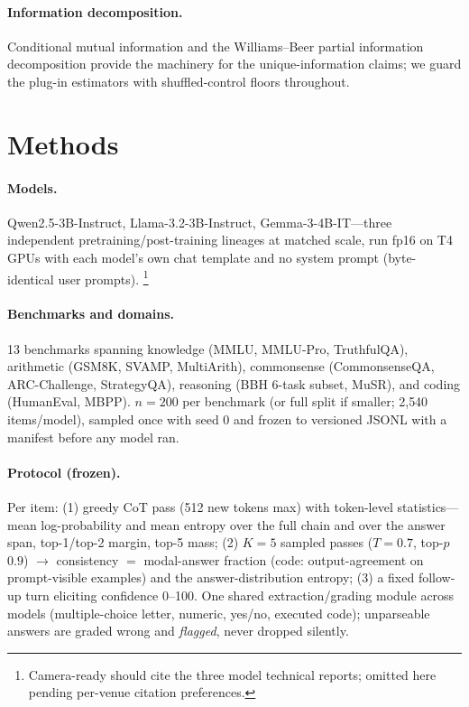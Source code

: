 \documentclass[10pt]{article}
\begin{document}
\paragraph{Information decomposition.} Conditional mutual information and the Williams--Beer
partial information decomposition \citep{williams2010pid} provide the machinery for the
unique-information claims; we guard the plug-in estimators with shuffled-control floors
throughout.

\section{Methods}
\paragraph{Models.} Qwen2.5-3B-Instruct, Llama-3.2-3B-Instruct, Gemma-3-4B-IT---three
independent pretraining/post-training lineages at matched scale, run fp16 on T4 GPUs with each
model's own chat template and no system prompt (byte-identical user prompts).%
\footnote{Camera-ready should cite the three model technical reports; omitted here pending
per-venue citation preferences.}

\paragraph{Benchmarks and domains.} 13 benchmarks spanning knowledge (MMLU, MMLU-Pro,
TruthfulQA), arithmetic (GSM8K, SVAMP, MultiArith), commonsense (CommonsenseQA, ARC-Challenge,
StrategyQA), reasoning (BBH 6-task subset, MuSR), and coding (HumanEval, MBPP). $n{=}200$ per
benchmark (or full split if smaller; 2{,}540 items/model), sampled once with seed 0 and frozen
to versioned JSONL with a manifest before any model ran.

\paragraph{Protocol (frozen).} Per item: (1) greedy CoT pass (512 new tokens max) with
token-level statistics---mean log-probability and mean entropy over the full chain and over the
answer span, top-1/top-2 margin, top-5 mass; (2) $K{=}5$ sampled passes ($T{=}0.7$, top-$p$
$0.9$) $\rightarrow$ consistency $=$ modal-answer fraction (code: output-agreement on
prompt-visible examples) and the answer-distribution entropy; (3) a fixed follow-up turn
eliciting confidence 0--100. One shared extraction/grading module across models (multiple-choice
letter, numeric, yes/no, executed code); unparseable answers are graded wrong and
\emph{flagged}, never dropped silently.
\end{document}
